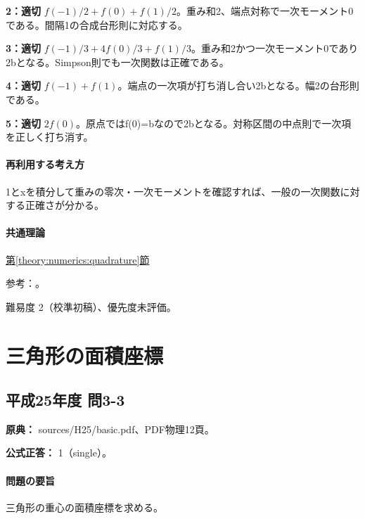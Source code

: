 \noindent\textbf{2：適切} \(f(-1)/2+f(0)+f(1)/2\)。重み和2、端点対称で一次モーメント0である。間隔1の合成台形則に対応する。\par

\noindent\textbf{3：適切} \(f(-1)/3+4f(0)/3+f(1)/3\)。重み和2かつ一次モーメント0であり2bとなる。Simpson則でも一次関数は正確である。\par

\noindent\textbf{4：適切} \(f(-1)+f(1)\)。端点の一次項が打ち消し合い2bとなる。幅2の台形則である。\par

\noindent\textbf{5：適切} \(2f(0)\)。原点ではf(0)=\allowbreak{}bなので2bとなる。対称区間の中点則で一次項を正しく打ち消す。\par

\paragraph{再利用する考え方} 1とxを積分して重みの零次・一次モーメントを確認すれば、一般の一次関数に対する正確さが分かる。

\paragraph{共通理論} \hyperref[theory:numerics:quadrature]{第\ref*{theory:numerics:quadrature}節}

\par 参考：\cite{nist_quadrature}。

\par 難易度 2（校準初稿）、優先度未評価。

\section{三角形の面積座標}

\subsection{平成25年度 問3-3}
\label{q:h25-reg-basic-3-3}

\noindent\textbf{原典：} sources/H25/basic.pdf、PDF物理12頁。

\textbf{公式正答：} 1（single）。

\paragraph{問題の要旨} 三角形の重心の面積座標を求める。

